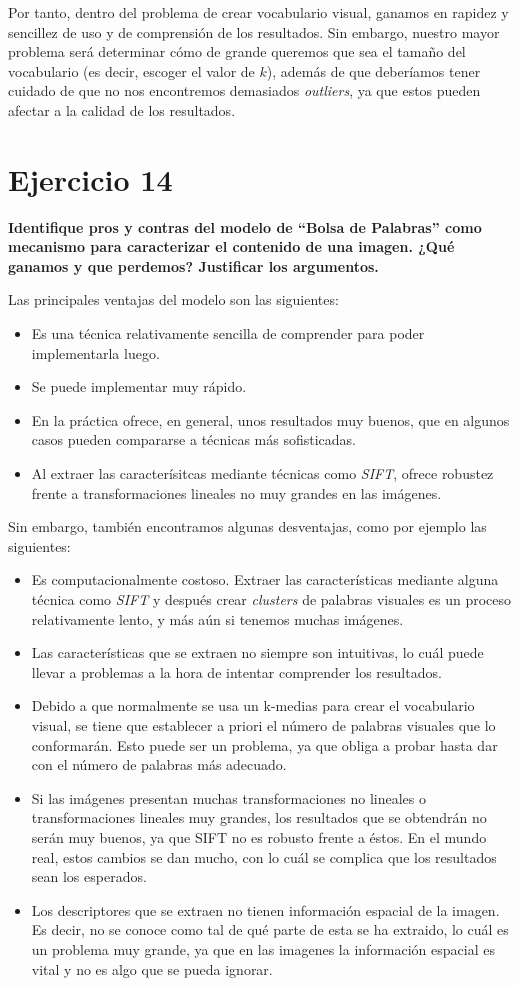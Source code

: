\documentclass[11pt,a4paper]{article}
\newcommand{\question}[1]{\noindent\textbf{#1}}
\newcommand{\nonumbersection}[1]{\section*{#1}\addcontentsline{toc}{section}{#1}}
\begin{document}
Por tanto, dentro del problema de crear vocabulario visual, ganamos en rapidez y sencillez de uso y de comprensión de los
resultados. Sin embargo, nuestro mayor problema será determinar cómo de grande queremos que sea el tamaño del vocabulario (es
decir, escoger el valor de $k$), además de que deberíamos tener cuidado de que no nos encontremos demasiados \textit{outliers},
ya que estos pueden afectar a la calidad de los resultados.

\nonumbersection{Ejercicio 14}

\question{Identifique pros y contras del modelo de “Bolsa de Palabras” como
mecanismo para caracterizar el contenido de una imagen. ¿Qué ganamos y
que perdemos? Justificar los argumentos.}

Las principales ventajas del modelo son las siguientes:

\begin{itemize}
	\item Es una técnica relativamente sencilla de comprender para poder implementarla luego.
	\item Se puede implementar muy rápido.
	\item En la práctica ofrece, en general, unos resultados muy buenos, que en algunos casos pueden compararse a
	técnicas más sofisticadas.
	\item Al extraer las caracterísitcas mediante técnicas como \textit{SIFT}, ofrece robustez frente a transformaciones lineales
	no muy grandes en las imágenes.
\end{itemize}

Sin embargo, también encontramos algunas desventajas, como por ejemplo las siguientes:

\begin{itemize}
	\item Es computacionalmente costoso. Extraer las características mediante alguna técnica como \textit{SIFT} y después
	crear \textit{clusters} de palabras visuales es un proceso relativamente lento, y más aún si tenemos muchas imágenes.
	\item Las características que se extraen no siempre son intuitivas, lo cuál puede llevar a problemas a la hora de
	intentar comprender los resultados.
	\item Debido a que normalmente se usa un k-medias para crear el vocabulario visual, se tiene que establecer a priori
	el número de palabras visuales que lo conformarán. Esto puede ser un problema, ya que obliga a probar hasta dar con el número
	de palabras más adecuado.
	\item Si las imágenes presentan muchas transformaciones no lineales o transformaciones lineales muy grandes,
	los resultados que se obtendrán no serán muy buenos, ya que SIFT no es robusto frente a éstos. En el mundo real,
	estos cambios se dan mucho, con lo cuál se complica que los resultados sean los esperados.
	\item Los descriptores que se extraen no tienen información espacial de la imagen. Es decir, no se conoce como
	tal de qué parte de esta se ha extraido, lo cuál es un problema muy grande, ya que en las imagenes la información
	espacial es vital y no es algo que se pueda ignorar.
\end{itemize}
\end{document}
